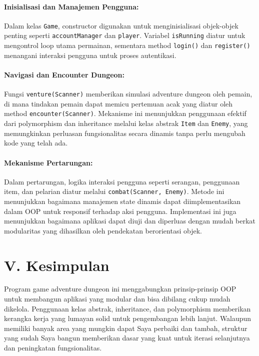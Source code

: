 \documentclass{article}
\begin{document}
\paragraph{Inisialisasi dan Manajemen Pengguna:}
Dalam kelas \texttt{Game}, constructor digunakan untuk menginisialisasi objek-objek penting seperti \texttt{accountManager} dan \texttt{player}. Variabel \texttt{isRunning} diatur untuk mengontrol loop utama permainan, sementara method \texttt{login()} dan \texttt{register()} menangani interaksi pengguna untuk proses autentikasi.

\paragraph{Navigasi dan Encounter Dungeon:}
Fungsi \texttt{venture(Scanner)} memberikan simulasi adventure dungeon oleh pemain, di mana tindakan pemain dapat memicu pertemuan acak yang diatur oleh method \texttt{encounter(Scanner)}. Mekanisme ini menunjukkan penggunaan efektif dari polymorphism dan inheritance melalui kelas abstrak \texttt{Item} dan \texttt{Enemy}, yang memungkinkan perluasan fungsionalitas secara dinamis tanpa perlu mengubah kode yang telah ada.

\paragraph{Mekanisme Pertarungan:}
Dalam pertarungan, logika interaksi pengguna seperti serangan, penggunaan item, dan pelarian diatur melalui \texttt{combat(Scanner, Enemy)}. Metode ini menunjukkan bagaimana manajemen state dinamis dapat diimplementasikan dalam OOP untuk responsif terhadap aksi pengguna. Implementasi ini juga menunjukkan bagaimana aplikasi dapat diuji dan diperluas dengan mudah berkat modularitas yang dihasilkan oleh pendekatan berorientasi objek.


\section*{V. Kesimpulan}

Program game adventure dungeon ini menggabungkan prinsip-prinsip OOP untuk membangun aplikasi yang modular dan bisa dibilang cukup mudah dikelola. Penggunaan kelas abstrak, inheritance, dan polymorphism memberikan kerangka kerja yang lumayan solid untuk pengembangan lebih lanjut. Walaupun memiliki banyak area yang mungkin dapat Saya perbaiki dan tambah, struktur yang sudah Saya bangun memberikan dasar yang kuat untuk iterasi selanjutnya dan peningkatan fungsionalitas.
\end{document}
